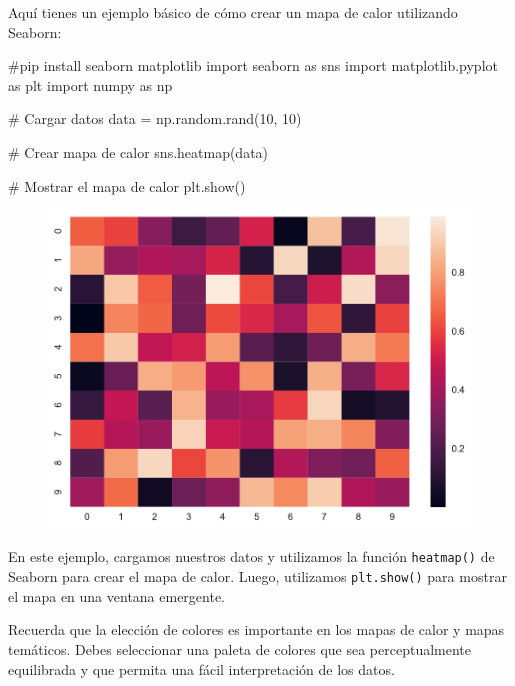 \documentclass[
  a4paper,
]{article}
\newenvironment{Shaded}{}{}
\newcommand{\CommentTok}[1]{\textcolor[rgb]{0.42,0.45,0.49}{#1}}
\newcommand{\DecValTok}[1]{\textcolor[rgb]{0.00,0.36,0.77}{#1}}
\newcommand{\ImportTok}[1]{\textcolor[rgb]{0.01,0.18,0.38}{#1}}
\newcommand{\NormalTok}[1]{\textcolor[rgb]{0.14,0.16,0.18}{#1}}
\newcommand{\OperatorTok}[1]{\textcolor[rgb]{0.14,0.16,0.18}{#1}}
\begin{document}
Aquí tienes un ejemplo básico de cómo crear un mapa de calor utilizando
Seaborn:

\begin{Shaded}
\begin{Highlighting}[]
\CommentTok{\#pip install seaborn matplotlib}
\ImportTok{import}\NormalTok{ seaborn }\ImportTok{as}\NormalTok{ sns}
\ImportTok{import}\NormalTok{ matplotlib.pyplot }\ImportTok{as}\NormalTok{ plt}
\ImportTok{import}\NormalTok{ numpy }\ImportTok{as}\NormalTok{ np}

\CommentTok{\# Cargar datos}
\NormalTok{data }\OperatorTok{=}\NormalTok{ np.random.rand(}\DecValTok{10}\NormalTok{, }\DecValTok{10}\NormalTok{)}

\CommentTok{\# Crear mapa de calor}
\NormalTok{sns.heatmap(data)}

\CommentTok{\# Mostrar el mapa de calor}
\NormalTok{plt.show()}
\end{Highlighting}
\end{Shaded}

\begin{figure}[H]

{\centering \includegraphics{index_files/figure-pdf/cell-25-output-1.pdf}

}

\end{figure}

En este ejemplo, cargamos nuestros datos y utilizamos la función
\texttt{heatmap()} de Seaborn para crear el mapa de calor. Luego,
utilizamos \texttt{plt.show()} para mostrar el mapa en una ventana
emergente.

Recuerda que la elección de colores es importante en los mapas de calor
y mapas temáticos. Debes seleccionar una paleta de colores que sea
perceptualmente equilibrada y que permita una fácil interpretación de
los datos.
\end{document}
